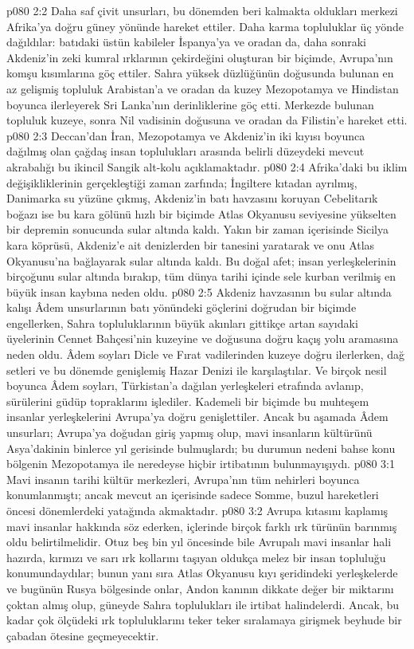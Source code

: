\vs p080 2:2 Daha saf çivit unsurları, bu dönemden beri kalmakta oldukları merkezi Afrika’ya doğru güney yönünde hareket ettiler. Daha karma topluluklar üç yönde dağıldılar: batıdaki üstün kabileler İspanya’ya ve oradan da, daha sonraki Akdeniz’in zeki kumral ırklarının çekirdeğini oluşturan bir biçimde, Avrupa’nın komşu kısımlarına göç ettiler. Sahra yüksek düzlüğünün doğusunda bulunan en az gelişmiş topluluk Arabistan’a ve oradan da kuzey Mezopotamya ve Hindistan boyunca ilerleyerek Sri Lanka’nın derinliklerine göç etti. Merkezde bulunan topluluk kuzeye, sonra Nil vadisinin doğusuna ve oradan da Filistin’e hareket etti.
\vs p080 2:3 Deccan’dan İran, Mezopotamya ve Akdeniz’in iki kıyısı boyunca dağılmış olan çağdaş insan toplulukları arasında belirli düzeydeki mevcut akrabalığı bu ikincil Sangik alt\hyp{}kolu açıklamaktadır.
\vs p080 2:4 Afrika’daki bu iklim değişikliklerinin gerçekleştiği zaman zarfında; İngiltere kıtadan ayrılmış, Danimarka su yüzüne çıkmış, Akdeniz’in batı havzasını koruyan Cebelitarık boğazı ise bu kara gölünü hızlı bir biçimde Atlas Okyanusu seviyesine yükselten bir depremin sonucunda sular altında kaldı. Yakın bir zaman içerisinde Sicilya kara köprüsü, Akdeniz’e ait denizlerden bir tanesini yaratarak ve onu Atlas Okyanusu’na bağlayarak sular altında kaldı. Bu doğal afet; insan yerleşkelerinin birçoğunu sular altında bırakıp, tüm dünya tarihi içinde sele kurban verilmiş en büyük insan kaybına neden oldu.
\vs p080 2:5 Akdeniz havzasının bu sular altında kalışı Âdem unsurlarının batı yönündeki göçlerini doğrudan bir biçimde engellerken, Sahra topluluklarının büyük akınları gittikçe artan sayıdaki üyelerinin Cennet Bahçesi’nin kuzeyine ve doğusuna doğru kaçış yolu aramasına neden oldu. Âdem soyları Dicle ve Fırat vadilerinden kuzeye doğru ilerlerken, dağ setleri ve bu dönemde genişlemiş Hazar Denizi ile karşılaştılar. Ve birçok nesil boyunca Âdem soyları, Türkistan’a dağılan yerleşkeleri etrafında avlanıp, sürülerini güdüp topraklarını işlediler. Kademeli bir biçimde bu muhteşem insanlar yerleşkelerini Avrupa’ya doğru genişlettiler. Ancak bu aşamada Âdem unsurları; Avrupa’ya doğudan giriş yapmış olup, mavi insanların kültürünü Asya’dakinin binlerce yıl gerisinde bulmuşlardı; bu durumun nedeni bahse konu bölgenin Mezopotamya ile neredeyse hiçbir irtibatının bulunmayışıydı.
\vs p080 3:1 Mavi insanın tarihi kültür merkezleri, Avrupa’nın tüm nehirleri boyunca konumlanmıştı; ancak mevcut an içerisinde sadece Somme, buzul hareketleri öncesi dönemlerdeki yatağında akmaktadır.
\vs p080 3:2 Avrupa kıtasını kaplamış mavi insanlar hakkında söz ederken, içlerinde birçok farklı ırk türünün barınmış oldu belirtilmelidir. Otuz beş bin yıl öncesinde bile Avrupalı mavi insanlar hali hazırda, kırmızı ve sarı ırk kollarını taşıyan oldukça melez bir insan topluluğu konumundaydılar; bunun yanı sıra Atlas Okyanusu kıyı şeridindeki yerleşkelerde ve bugünün Rusya bölgesinde onlar, Andon kanının dikkate değer bir miktarını çoktan almış olup, güneyde Sahra toplulukları ile irtibat halindelerdi. Ancak, bu kadar çok ölçüdeki ırk topluluklarını teker teker sıralamaya girişmek beyhude bir çabadan ötesine geçmeyecektir.

